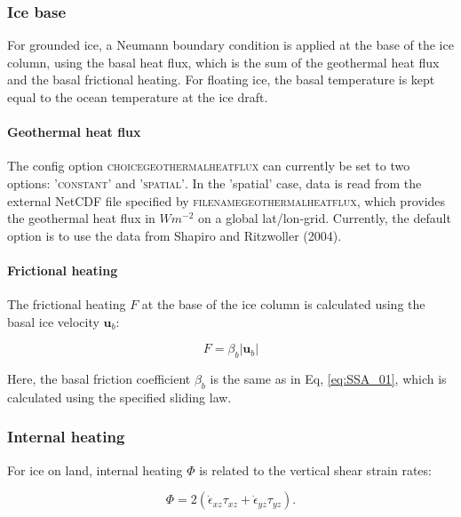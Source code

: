 \documentclass{article}
\begin{document}
\subsubsection{Ice base}

For grounded ice, a Neumann boundary condition is applied at the base of the ice column, using the basal heat flux, which is the sum of the geothermal heat flux and the basal frictional heating. For floating ice, the basal temperature is kept equal to the ocean temperature at the ice draft.

\paragraph{Geothermal heat flux}
The config option \textsc{choice\textunderscore geothermal\textunderscore heat\textunderscore flux} can currently be set to two options: \textsc{'constant'} and \textsc{'spatial'}. In the 'spatial' case, data is read from the external NetCDF file specified by \textsc{filename\textunderscore geothermal\textunderscore heat\textunderscore flux}, which provides the geothermal heat flux in $W m^{-2}$ on a global lat/lon-grid. Currently, the default option is to use the data from Shapiro and Ritzwoller (2004).

\paragraph{Frictional heating}
The frictional heating $F$ at the base of the ice column is calculated using the basal ice velocity $\textbf{u}_b$:

\begin{equation}
F = \beta_b \left| \textbf{u}_b\right|
\end{equation}

Here, the basal friction coefficient $\beta_b$ is the same as in Eq, \eqref{eq:SSA_01}, which is calculated using the specified sliding law.

\subsubsection{Internal heating}

For ice on land, internal heating $\Phi$ is related to the vertical shear strain rates:

\begin{equation}
\Phi = 2 \left( \dot{\epsilon}_{xz} \tau_{xz} + \dot{\epsilon}_{yz} \tau_{yz} \right).
\end{equation}
\end{document}
